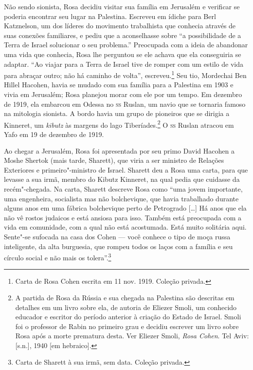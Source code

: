 Não sendo sionista, Rosa decidiu visitar sua família em Jerusalém e
verificar se poderia encontrar seu lugar na Palestina. Escreveu em
ídiche para Berl Katznelson, um dos líderes do movimento trabalhista
que conhecia através de suas conexões familiares, e pediu que a
aconselhasse sobre ``a possibilidade de a Terra de Israel solucionar o
seu problema.'' Preocupada com a ideia de abandonar uma vida que
conhecia, Rosa lhe perguntou se ele achava que ela conseguiria se
adaptar. ``Ao viajar para a Terra de Israel tive de romper com um estilo
de vida para abraçar outro; não há caminho de volta'', escreveu.\footnote{Carta de Rosa Cohen
escrita em 11 nov. 1919. Coleção privada.} Seu tio, Mordechai Ben
Hillel Hacohen, havia se mudado com sua família para a Palestina em 1903
e vivia em Jerusalém; Rosa planejou morar com ele por um tempo. Em
dezembro de 1919, ela embarcou em Odessa no \textsc{ss} Ruslan, um navio
que se tornaria famoso na mitologia sionista. A bordo havia um grupo de
pioneiros que se dirigia a Kinneret, um \textit{kibutz} às margens do lago
Tiberíades.\footnote{A partida de Rosa da Rússia e sua chegada na Palestina são
descritas em detalhes em um livro sobre ela, de autoria de Eliezer Smoli,
um conhecido educador e escritor do período anterior à criação do Estado
de Israel. Smoli foi o professor de Rabin no primeiro grau e decidiu
escrever um livro sobre Rosa após a morte prematura desta. Ver Eliezer
Smoli, \textit{Rosa Cohen}. Tel Aviv: {[}s.n.{]}, 1940 {[}em hebraico{]}.} 
O \textsc{ss} Ruslan atracou em Yafo em 19 de dezembro de 1919.

Ao chegar a Jerusalém, Rosa foi apresentada por seu primo David Hacohen
a Moshe Shertok (mais tarde, Sharett), que viria a ser ministro de
Relações Exteriores e primeiro"-ministro de Israel. Sharett deu a Rosa
uma carta, para que levasse a sua irmã, membro do Kibutz Kinneret, na
qual pedia que cuidasse da recém"-chegada. Na carta, Sharett descreve Rosa
como ``uma jovem importante, uma engenheira, socialista mas não
bolchevique, que havia trabalhado durante alguns anos em uma fábrica
bolchevique perto de Petrogrado {[}\ldots{}{]} Há anos que ela não vê rostos judaicos
e está ansiosa para isso. Também está preocupada com a vida em
comunidade, com a qual não está acostumada. Está muito solitária aqui. Sente"-se
sufocada na casa dos Cohen --- você conhece o tipo de moça russa
inteligente, da alta burguesia, que rompeu todos os laços com a família
e seu círculo social e não mais os tolera''.\footnote{Carta de Sharett à sua irmã, sem data. Coleção privada.}

